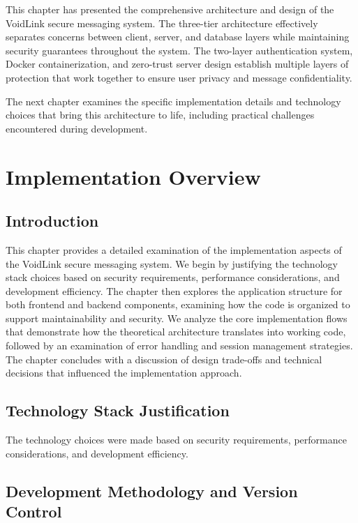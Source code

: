 \documentclass[12pt,a4paper,openany]{book}
\begin{document}
This chapter has presented the comprehensive architecture and design of the VoidLink secure messaging system. The three-tier architecture effectively separates concerns between client, server, and database layers while maintaining security guarantees throughout the system. The two-layer authentication system, Docker containerization, and zero-trust server design establish multiple layers of protection that work together to ensure user privacy and message confidentiality.

The next chapter examines the specific implementation details and technology choices that bring this architecture to life, including practical challenges encountered during development.

\chapter{Implementation Overview}
\label{ch:implementation}

\section*{Introduction}

This chapter provides a detailed examination of the implementation aspects of the VoidLink secure messaging system. We begin by justifying the technology stack choices based on security requirements, performance considerations, and development efficiency. The chapter then explores the application structure for both frontend and backend components, examining how the code is organized to support maintainability and security. We analyze the core implementation flows that demonstrate how the theoretical architecture translates into working code, followed by an examination of error handling and session management strategies. The chapter concludes with a discussion of design trade-offs and technical decisions that influenced the implementation approach.

\section{Technology Stack Justification}

The technology choices were made based on security requirements, performance considerations, and development efficiency.

\section{Development Methodology and Version Control}
\end{document}
